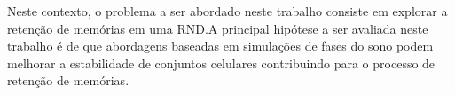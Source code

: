 Neste contexto, o problema a ser abordado neste trabalho consiste em explorar a retenção de memórias em uma RND.\@ A principal
hipótese a ser avaliada neste trabalho é de que abordagens baseadas em simulações de fases do sono podem melhorar a estabilidade
de conjuntos celulares contribuindo para o processo de retenção de memórias.




